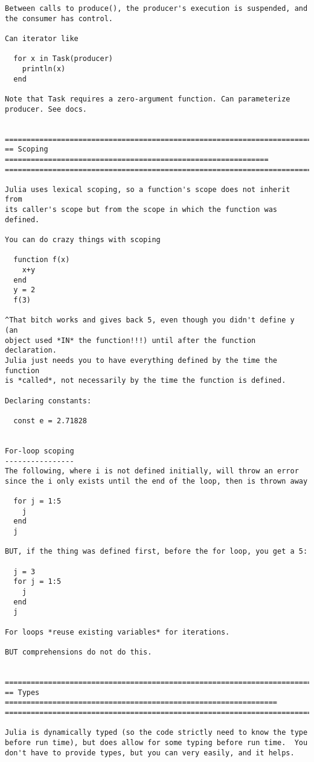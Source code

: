 \documentclass[12pt]{article}
\theoremstyle{plain}
\theoremstyle{definition}
\theoremstyle{remark}
\begin{document}
\begin{lstlisting}
Between calls to produce(), the producer's execution is suspended, and
the consumer has control.

Can iterator like

  for x in Task(producer)
    println(x)
  end

Note that Task requires a zero-argument function. Can parameterize
producer. See docs.


========================================================================
== Scoping =============================================================
========================================================================

Julia uses lexical scoping, so a function's scope does not inherit from
its caller's scope but from the scope in which the function was defined.

You can do crazy things with scoping

  function f(x)
    x+y
  end
  y = 2
  f(3)

^That bitch works and gives back 5, even though you didn't define y (an
object used *IN* the function!!!) until after the function declaration.
Julia just needs you to have everything defined by the time the function
is *called*, not necessarily by the time the function is defined.

Declaring constants:

  const e = 2.71828


For-loop scoping
----------------
The following, where i is not defined initially, will throw an error
since the i only exists until the end of the loop, then is thrown away

  for j = 1:5
    j
  end
  j

BUT, if the thing was defined first, before the for loop, you get a 5:

  j = 3
  for j = 1:5
    j
  end
  j

For loops *reuse existing variables* for iterations.

BUT comprehensions do not do this.


========================================================================
== Types ===============================================================
========================================================================

Julia is dynamically typed (so the code strictly need to know the type
before run time), but does allow for some typing before run time.  You
don't have to provide types, but you can very easily, and it helps.


\end{lstlisting}
\end{document}
